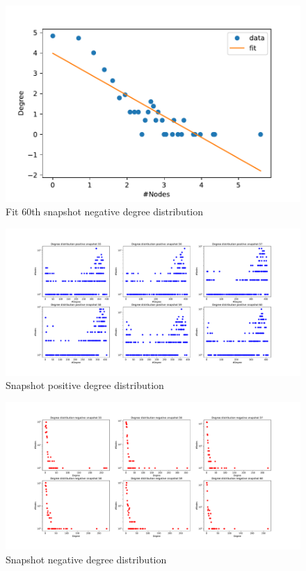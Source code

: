 \documentclass[sigchi]{acmart}
\begin{document}
\begin{figure}[H]
	\centering
	\includegraphics[width= \linewidth]{plot/60_snap_fit_degree_neg_dist.pdf}
	\caption{Fit 60th snapshot negative degree distribution}
\end{figure}
\begin{figure}[H]
	\centering
	\includegraphics[width= \linewidth]{plot/first_10_snap_degree_pos_dist.pdf}
	\caption{Snapshot positive degree distribution}
\end{figure}
\begin{figure}[H]
	\centering
	\includegraphics[width= \linewidth]{plot/first_10_snap_degree_neg_dist.pdf}
	\caption{Snapshot negative degree distribution}
\end{figure}
\end{document}
